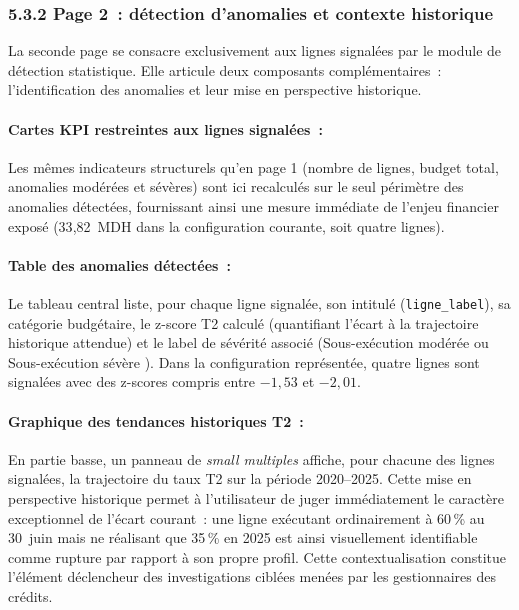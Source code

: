 \subsubsection*{5.3.2 \quad Page 2~: d\'etection d'anomalies et contexte historique}

La seconde page se consacre exclusivement aux lignes signal\'ees par le module
de d\'etection statistique. Elle articule deux composants compl\'ementaires~:
l'identification des anomalies et leur mise en perspective historique.

\paragraph{Cartes KPI restreintes aux lignes signal\'ees~:}
Les m\^emes indicateurs structurels qu'en page 1 (nombre de lignes, budget total,
anomalies mod\'er\'ees et s\'ev\`eres) sont ici recalcul\'es sur le seul p\'erim\`etre
des anomalies d\'etect\'ees, fournissant ainsi une mesure imm\'ediate de l'enjeu
financier expos\'e (33{,}82~MDH dans la configuration courante, soit quatre lignes).

\paragraph{Table des anomalies d\'etect\'ees~:}
Le tableau central liste, pour chaque ligne signal\'ee, son intitul\'e
(\texttt{ligne\_label}), sa cat\'egorie budg\'etaire, le z-score T2 calcul\'e
(quantifiant l'\'ecart \`a la trajectoire historique attendue) et le label de
s\'ev\'erit\'e associ\'e (\og Sous-ex\'ecution mod\'er\'ee \fg{} ou
\og Sous-ex\'ecution s\'ev\`ere \fg{}). Dans la configuration repr\'esent\'ee,
quatre lignes sont signal\'ees avec des z-scores compris entre $-1{,}53$ et $-2{,}01$.

\paragraph{Graphique des tendances historiques T2~:}
En partie basse, un panneau de \textit{small multiples} affiche, pour chacune
des lignes signal\'ees, la trajectoire du taux T2 sur la p\'eriode 2020--2025.
Cette mise en perspective historique permet \`a l'utilisateur de juger imm\'ediatement
le caract\`ere exceptionnel de l'\'ecart courant~: une ligne ex\'ecutant ordinairement
\`a 60\,\% au 30~juin mais ne r\'ealisant que 35\,\% en 2025 est ainsi visuellement
identifiable comme rupture par rapport \`a son propre profil. Cette contextualisation
constitue l'\'el\'ement d\'eclencheur des investigations cibl\'ees men\'ees par les
gestionnaires des cr\'edits.


